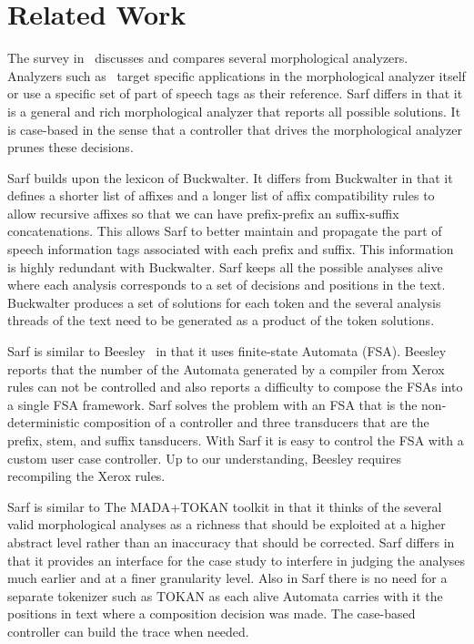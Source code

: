 \documentclass[11pt,letterpaper]{article}
\begin{document}

\section{Related Work }
\label{sec:related}

The survey in~\cite{Sughaiyer:04} discusses and compares
several morphological analyzers. 
Analyzers such as~\cite{Khoja:01,Darwish:02} 
target specific applications in the morphological 
analyzer itself or use a specific set of part of speech tags
as their reference.
Sarf differs in that it is a general and rich morphological 
analyzer that reports all possible solutions. 
It is case-based in the sense that a controller that drives
the morphological analyzer prunes these decisions. 

Sarf builds upon the lexicon of Buckwalter.
It differs from Buckwalter in that it defines a shorter list of affixes
and a longer list of affix compatibility rules to allow recursive 
affixes so that we can have prefix-prefix an suffix-suffix 
concatenations.
This allows Sarf to better maintain and propagate 
the part of speech information
tags associated with each prefix and suffix.
This information is highly 
redundant with Buckwalter.%
Sarf keeps all the possible analyses alive where each analysis
corresponds to a set of decisions and positions in the text. 
Buckwalter produces a set of solutions for each token 
and the several analysis threads of the text need to be 
generated as a product of the token solutions. 

Sarf is similar to Beesley~ in that it uses
finite-state Automata (FSA). 
Beesley reports that the number of the Automata generated by a compiler
from Xerox rules can not be controlled and also reports a difficulty to 
compose the FSAs into a single FSA framework. 
Sarf solves the problem with an FSA that is the non-deterministic 
composition of a controller and three
transducers that are the prefix, stem, and suffix tansducers. 
With Sarf it is easy to control the FSA with a custom user case 
controller. Up to our understanding, Beesley  
requires recompiling the Xerox rules.

Sarf is similar to The MADA+TOKAN toolkit in that it thinks of
the several valid morphological analyses as a richness that 
should be exploited at a higher abstract level rather than
an inaccuracy that should be corrected. 
Sarf differs in that it provides an interface for the 
case study to interfere in judging the analyses much earlier and
at a finer granularity level. 
Also in Sarf there is no need for a separate tokenizer such as
TOKAN as each alive Automata carries with it the positions in 
text where a composition decision was made. 
The case-based controller can build the trace 
when needed. 
\end{document}
